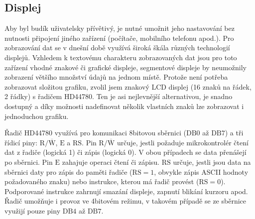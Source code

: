 \subsection{Displej}
Aby byl budík uživatelsky přívětivý, je nutné umožnit jeho nastavování bez
nutnosti připojení jiného zařízení (počítače, mobilního telefonu apod.).
Pro zobrazování dat se v dnešní době využívá široká škála různých technologií
displejů. Vzhledem k textovému charakteru zobrazovaných dat jsou pro toto
zařízení vhodné znakové či grafické displeje, segmentové displeje by neumožnily
zobrazení většího množství údajů na jednom místě. Protože není potřeba
zobrazovat složitou grafiku, zvolil jsem znakový LCD displej (16 znaků na
řádek, 2 řádky) s řadičem HD44780. Ten je asi nejlevnější alternativou, je
snadno dostupný a díky možnosti nadefinovat několik vlastních znaků lze
zobrazovat i jednoduchou grafiku.

Řadič HD44780 využívá pro komunikaci 8bitovou sběrnici ($\mathrm{DB0}$ až
$\mathrm{DB7}$) a tři řídicí piny: $\mathrm{R}/\overline{\mathrm{W}}$,
$\mathrm{E}$ a $\mathrm{RS}$. Pin $\mathrm{R}/\overline{\mathrm{W}}$ určuje,
jestli požaduje mikrokontrolér čtení dat z řadiče (logická 1) či zápis (logická
0). V obou případech se data přenášejí po sběrnici. Pin $\mathrm{E}$ zahajuje
operaci čtení či zápisu. $\mathrm{RS}$ určuje, jestli jsou data na sběrnici
daty pro zápis do paměti řadiče ($\mathrm{RS} = 1$, obvykle zápis ASCII hodnoty
požadovaného znaku) nebo instrukce, kterou má řadič provést ($\mathrm{RS} =
0$). Podporované instrukce zahrnují smazání displeje, zapnutí blikání kurzoru
apod. Řadič umožňuje i provoz ve 4bitovém režimu, v takovém případě se ze
sběrnice využijí pouze piny $\mathrm{DB4}$ až $\mathrm{DB7}$.


